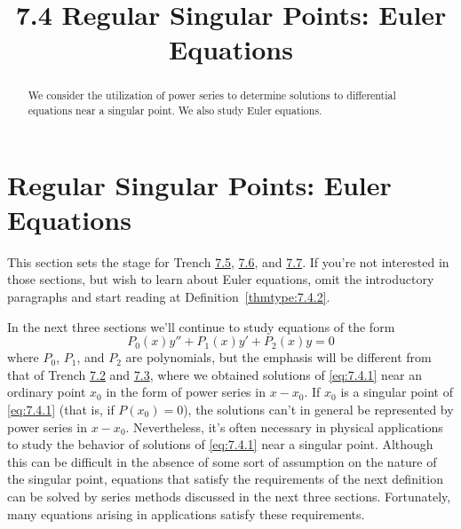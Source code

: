 \documentclass{ximera}
\title{7.4 Regular Singular Points:   Euler Equations}%
\begin{document}
\begin{abstract}
We consider the utilization of power series to determine solutions to differential equations near a singular point.  We also study Euler equations.
\end{abstract}

\maketitle

\section*{Regular Singular Points:   Euler Equations}

\begin{remark}This section sets the stage for Trench \href{https://ximera.osu.edu/ode/main/frobeniusI/frobeniusI}{7.5},
\href{https://ximera.osu.edu/ode/main/frobeniusII/frobeniusII}{7.6},
and \href{https://ximera.osu.edu/ode/main/frobeniusIII/frobeniusIII}{7.7}. If you're not interested in those sections, but wish
to learn about Euler equations, omit the introductory paragraphs
and start reading at Definition~\ref{thmtype:7.4.2}.
\end{remark}

In the next three sections we'll continue to study  equations of
the form
\begin{equation}\label{eq:7.4.1}
P_0(x)y''+P_1(x)y'+P_2(x)y=0
\end{equation}
where $P_0$, $P_1$, and $P_2$ are polynomials, but the emphasis will
be different from that of Trench \href{https://ximera.osu.edu/ode/main/seriesSolNearOrdinaryPtI/seriesSolNearOrdinaryPtI}{7.2} and \href{https://ximera.osu.edu/ode/main/seriesSolNearOrdinaryPtII/seriesSolNearOrdinaryPtII}{7.3},
where we
obtained solutions of \eqref{eq:7.4.1} near an ordinary point $x_0$ in the
form of power series in $x-x_0$. If $x_0$ is a singular point of
\eqref{eq:7.4.1} (that is, if $P(x_0)=0$),  the solutions can't in
general be represented by power series in $x-x_0$. Nevertheless, it's
often necessary in physical applications to study the behavior of
solutions of \eqref{eq:7.4.1} near a singular point. Although this can be
difficult in the absence of some sort of assumption on the nature of
the singular point, equations that satisfy the requirements of the
next definition can be solved by series methods discussed in the
next three sections. Fortunately, many equations arising in
applications satisfy these requirements.
\end{document}
